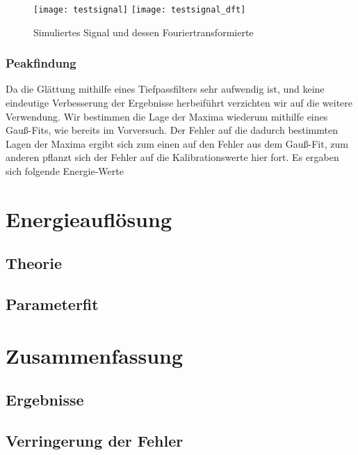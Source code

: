 \documentclass{../Misc/MontavonLaTeX/Montavon}
\newcommand{\halfwidth}{0.48\textwidth}
\begin{document}
\begin{figure}[h]
\texttt{[image: testsignal]}
\texttt{[image: testsignal\_dft]}
\caption{Simuliertes Signal und dessen Fouriertransformierte}
\label{fig:Fourier}
\end{figure}


\subsubsection{Peakfindung}
Da die Glättung mithilfe eines Tiefpassfilters sehr aufwendig ist,
und keine eindeutige Verbesserung der Ergebnisse herbeiführt verzichten
wir auf die weitere Verwendung. Wir bestimmen die Lage der Maxima
wiederum mithilfe eines Gauß-Fits, wie bereits im Vorversuch. Der
Fehler auf die dadurch bestimmten Lagen der Maxima ergibt sich zum
einen auf den Fehler aus dem Gauß-Fit, zum anderen pflanzt sich der
Fehler auf die Kalibrationswerte hier fort. Es ergaben sich folgende
Energie-Werte 

\begin{table}[h]
\centering
\small
\makebox[\textwidth][c]{}
\end{table}

\section{Energieauflösung}
\subsection{Theorie}

\subsection{Parameterfit}

\section{Zusammenfassung}
\subsection{Ergebnisse}

\subsection{Verringerung der Fehler}
\end{document}
